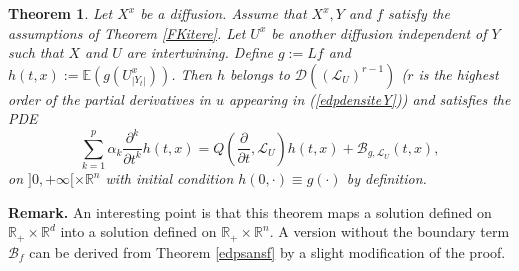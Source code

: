 \documentclass[a4paper, 11pt]{article}
\newtheorem{thm}{Theorem}%
\newenvironment{rmq}{\smallskip \noindent\textbf{Remark.}}{}
\newcommand{\R}{\mathbb{R}}
\newcommand{\E}{\mathbb{E}}
\newcommand{\1}{\mathbf{1}}
\begin{document}
\begin{thm}\label{intertwining}
Let $X^x$ be a diffusion. Assume that $X^x, Y$ and $f$ satisfy the assumptions of Theorem \ref{FKitere}. Let $U^x$ be another diffusion independent of $Y$ such that $X$ and $U$ are intertwining. Define $g:=Lf$ and $h(t,x):=\E(g(U^x_{|Y_t|}))$. Then $h$ belongs to $\mathcal{D}((\mathcal{L}_U)^{r-1})$ ($r$ is the highest order of the partial derivatives in $u$ appearing in (\ref{edpdensiteY})) and satisfies the PDE
\begin{equation}
\label{eq:83}
\sum_{k=1}^{p} \alpha_k \frac{\partial^k}{\partial t^k}h(t,x)=Q(\frac{\partial}{\partial t},\mathcal{L}_U)h(t,x)+\mathcal{B}_{g,\mathcal{L}_U}(t,x),
\end{equation}
on $]0,+\infty[\times \R^n$ with initial condition $h(0,\cdot)\equiv g(\cdot)$ by definition.
\end{thm}
\begin{rmq}
An interesting point is that this theorem maps a solution defined on $\R_+\times \R^d$ into a solution defined on $\R_+\times \R^n$. A version without the boundary term $\mathcal{B}_{f}$ can be derived from Theorem \ref{edpsansf} by a slight modification of the proof. 
\end{rmq}
\bigskip
\end{document}
